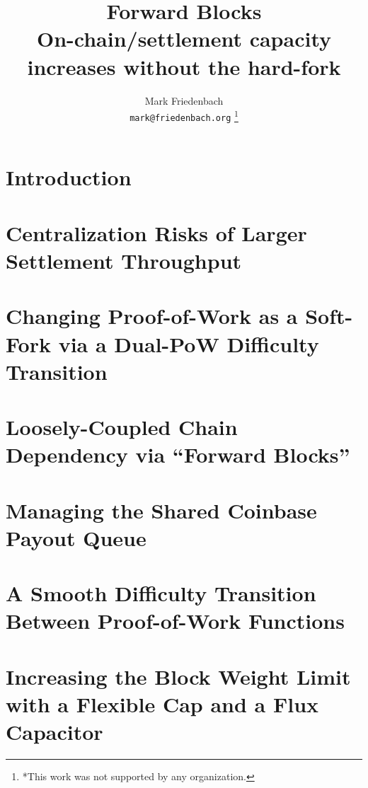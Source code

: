 \documentclass[letterpaper, 10 pt, conference]{ieeeconf}
\title{\bf
  {\LARGE Forward Blocks}\\
  {\Large On-chain/settlement capacity increases without the hard-fork}
}
\author{Mark Friedenbach\\{\tt\small mark@friedenbach.org}%
\thanks{*This work was not supported by any organization.}%
}
\begin{document}
\maketitle
\thispagestyle{empty}
\pagestyle{empty}

\begin{abstract}

\end{abstract}

\section{Introduction} \label{introduction}


\section{Centralization Risks of Larger Settlement Throughput} \label{centralizationrisk}


\section{Changing Proof-of-Work as a Soft-Fork via a Dual-PoW Difficulty Transition} \label{dualpow}


\section{Loosely-Coupled Chain Dependency via ``Forward Blocks''} \label{forwardblocks}


\section{Managing the Shared Coinbase Payout Queue} \label{coinbasepayoutqueue}


\section{A Smooth Difficulty Transition Between Proof-of-Work Functions} \label{smoothdifficulty}


\section{Increasing the Block Weight Limit with a Flexible Cap and a Flux Capacitor} \label{flexcap}

\end{document}
